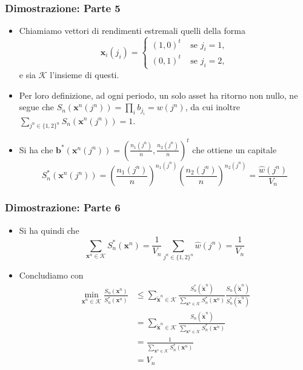 \documentclass{beamer}
\theoremstyle{plain}
\theoremstyle{definition}
\theoremstyle{remark}
\newcommand{\x}{\bm{x}}
\newcommand{\B}{\bm{b}}
\begin{document}
\begin{frame}
	\frametitle{Dimostrazione: Parte 5}
	\begin{itemize}
		\item Chiamiamo vettori di rendimenti estremali quelli della forma 
		\begin{equation*}
		\x_i(j_i) = \begin{cases}
		(1,0)^t\;\;\;\; \text{se } j_i=1, \\
		(0,1)^t\;\;\;\; \text{se } j_i=2,
		\end{cases}
		\end{equation*}
		e sia $\mathcal{K}$ l'insieme di questi.
		\item Per loro definizione, ad ogni periodo, un solo asset ha ritorno non nullo, ne segue che
		$S_n(\x^n(j^n))=\prod_{i}{b_{j_i}}=w(j^n)$, da cui inoltre $\sum_{j^n\in\{1,2\}^n}{S_n(\x^n(j^n))}=1$.
		\item Si ha che $
		\B^*(\x^n(j^n))=\left(\frac{n_1(j^n)}{n},\frac{n_2(j^n)}{n}\right)^t$ che ottiene un capitale
		\begin{equation*} S_n^*(\x^n(j^n))=\left(\frac{n_1(j^n)}{n}\right)^{n_1(j^n)}\left(\frac{n_2(j^n)}{n}\right)^{n_2(j^n)}=\frac{\hat{w}(j^n)}{V_n}
		\end{equation*}
	\end{itemize}
\end{frame}

\begin{frame}
	\frametitle{Dimostrazione: Parte 6}
	\begin{itemize}
		\item Si ha quindi che
		\begin{equation*}
		\sum_{\x^n\in\mathcal{K}}{S_n^*(\x^n)}=\frac{1}{V_n}\sum_{j^n\in\{1,2\}^n}{\hat{w}(j^n)}=\frac{1}{V_n}
		\end{equation*}
		\item Concludiamo con
		\begin{equation*}
		\begin{split}
		\min\limits_{\x^n\in\mathcal{K}}\frac{S_n(\x^n)}{S_n^*(\x^n)}& \leq \sum_{\tilde{\x}^n\in\mathcal{K}}\frac{S_n^*(\tilde{\x}^n)}{\sum_{\x^n\in\mathcal{K}}{S_n^*(\x^n)}}\frac{S_n(\tilde{\x}^n)}{S_n^*(\tilde{\x}^n)}\\
		& = \sum_{\tilde{\x}^n\in\mathcal{K}}{\frac{S_n(\tilde{\x}^n)}{\sum_{\x^n\in\mathcal{K}}{S_n^*(\x^n)}}}\\
		& = \frac{1}{\sum_{\x^n\in\mathcal{K}}{S_n^*(\x^n)}}\\
		& = V_n
		\end{split}
		\end{equation*}
	\end{itemize}
\end{frame}
\end{document}
